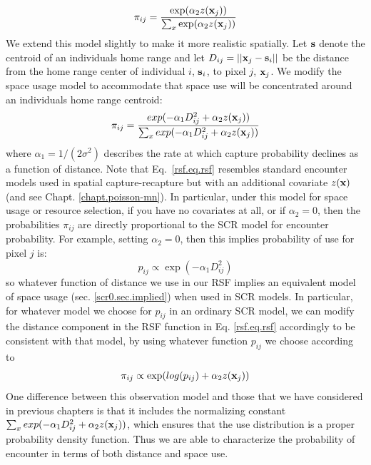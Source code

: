 \[
 \pi_{ij} = \frac{ \exp( \alpha_{2} z({\bf x}_{j}) ) }{ \sum_{x}   \exp(\alpha_{2} z({\bf x}_{j}))}
\]
We extend this model slightly to make it more realistic spatially. Let
${\bf s}$ denote the centroid of an individuals home range and let
$D_{ij} = ||{\bf x}_{j} - {\bf s}_{i}||$ be the distance from the home
range center of individual $i$, ${\bf s}_{i}$, to pixel $j$, ${\bf
  x}_{j}$. We modify the space usage model to accommodate that space
use will be concentrated around an individuals home range centroid:
\begin{equation}
 \pi_{ij} = \frac{ exp( -\alpha_{1} D_{ij}^{2} +\alpha_{2} z({\bf x}_{j}) ) }
{ \sum_{x} exp(-\alpha_{1} D_{ij}^{2} +\alpha_{2} z({\bf x}_{j}))}
\label{rsf.eq.rsf}
\end{equation}
where $\alpha_1=1/(2\sigma^2)$ describes the rate at which capture
probability declines as a function of distance. Note that
Eq.~\ref{rsf.eq.rsf} resembles standard encounter models used in
spatial capture-recapture but with an additional covariate $z({\bf
  x})$ (and see Chapt. \ref{chapt.poisson-mn}).  In particular, under
this model for space usage or resource selection, if you have no
covariates at all, or if $\alpha_{2} = 0$, then the probabilities
$\pi_{ij}$ are directly proportional to the SCR model for encounter
probability.  For example, setting $\alpha_{2} = 0$, then this implies
probability of use for pixel $j$ is:
\[
p_{ij} \propto  \exp( -\alpha_{1} D_{ij}^{2})
\]
so whatever function of distance we use in our RSF implies an
equivalent model of space usage (sec. \ref{scr0.sec.implied}) when
used in SCR models. In particular, for whatever model we choose for
$p_{ij}$ in an ordinary SCR model, we can modify the distance
component in the RSF function in Eq. \ref{rsf.eq.rsf} accordingly to
be consistent with that model, by using whatever function $p_{ij}$ we
choose according to
\[
\pi_{ij} \propto \exp( log(p_{ij}) + \alpha_{2} z({\bf x}_{j}) )
\]
One difference between this observation model and those that we have
considered in previous chapters is that it includes the normalizing
constant $\sum_{x} exp(-\alpha_{1} D_{ij}^{2} +\alpha_{2} z({\bf
  x}_{j}))$, which ensures that the use distribution is a proper
probability density function. Thus we are able to characterize the
probability of encounter in terms of both distance and space use.

